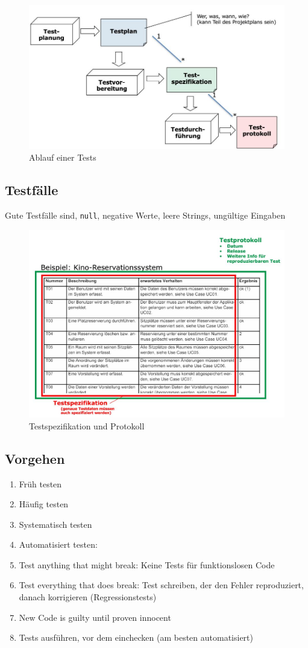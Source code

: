 \begin{figure}[h!]
	\centering
	\includegraphics[width=0.45\linewidth]{images/testing}
	\caption{Ablauf einer Tests}
	\label{fig:testing}
\end{figure}

\subsection{Testfälle}
Gute Testfälle sind, \lstinline|null|, negative Werte, leere Strings, ungültige Eingaben
\begin{figure}[h!]
	\centering
	\includegraphics[width=0.5\linewidth]{images/testspec_protocol}
	\caption{Testspezifikation und Protokoll}
	\label{fig:testspecprotocol}
\end{figure}

\subsection{Vorgehen}
\begin{enumerate}
	\item Früh testen
	\item Häufig testen
	\item Systematisch testen
	\item Automatisiert testen: 
	\item Test anything that might break: Keine Tests für funktionslosen Code
	\item Test everything that does break: Test schreiben, der den Fehler reproduziert, danach korrigieren (Regressionstests)
	\item New Code is guilty until proven innocent
	\item Tests ausführen, vor dem einchecken (am besten automatisiert)
\end{enumerate}


